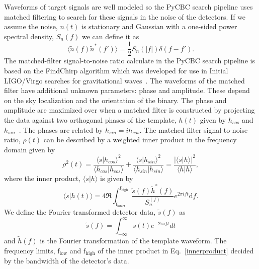 Waveforms of target signals are well modeled so the PyCBC search pipeline uses matched filtering to search for these signals in the noise of the detectors. If we assume the noise, $n(t)$ is stationary and Gaussian with a one-sided power spectral density, $S_n(f)$ we can define it as
\begin{equation}
    \langle\tilde{n}(f)\tilde{n}^*(f')\rangle=\frac{1}{2}S_n(|f|)\delta(f-f').
\end{equation}
The matched-filter signal-to-noise ratio calculate in the PyCBC search pipeline is based on the FindChirp algorithm which was developed for use in Initial LIGO/Virgo searches for gravitational waves~\cite{Allen:2005fk}. The waveforms of the matched filter have additional unknown parameters: phase and amplitude. These depend on the sky localization and the orientation of the binary. The phase and amplitude are maximized over when a matched filter is constructed by projecting the data against two orthogonal phases of the template, $h(t)$ given by $h_{cos}$ and $h_{sin}$~\cite{Allen:2005fk}. The phases are related by $h_{sin} = ih_{cos}$. The matched-filter signal-to-noise ratio, $\rho(t)$ can be described by a weighted inner product in the frequency domain given by~\cite{Usman:2015kfa}
\begin{equation}\label{snr}
    \rho^2(t) = \frac{\langle s|h_{cos}\rangle^2}{\langle h_{cos}|h_{cos}\rangle}+\frac{\langle s|h_{sin}\rangle^2}{\langle h_{sin}|h_{sin}\rangle} = \frac{|\langle s|h\rangle|^2}{\langle h|h \rangle},
\end{equation}
where the inner product, $\langle s|h \rangle$ is given by
\begin{equation}\label{innerproduct}
    \langle s|h(t)\rangle = 4 \Re \int_{\mathrm{f_{lower}}}^{\mathrm{f_{high}}} \frac{\tilde{s}(f) \tilde{h}^*(f)}{S_{n}^(f)}e^{2\pi ift} \mathrm{d}f.
\end{equation}
We define the Fourier transformed detector data, $\tilde{s}(f)$ as
\begin{equation}
    \tilde{s}(f) = \int_{-\infty}^{\infty} s(t)e^{-2\pi ift} dt
\end{equation}
and $\tilde{h}(f)$ is the Fourier transformation of the template waveform. The frequency limits, $\mathrm{f_{low}}$ and $\mathrm{f_{high}}$ of the inner product in Eq.~\ref{innerproduct} decided by the bandwidth of the detector's data. 

